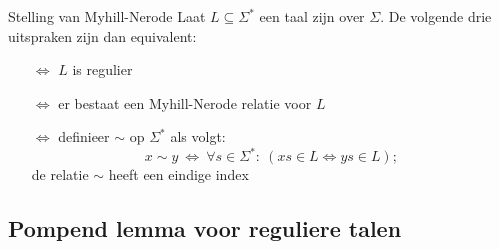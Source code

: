 \begin{lem}{Stelling van Myhill-Nerode}
    \vspace{-0.1cm}
    Laat $L \subseteq \Sigma^*$ een taal zijn over $\Sigma$. De volgende drie uitspraken zijn dan equivalent:
    \begin{itemize}
        \item[$\Leftrightarrow$] $L$ is regulier
        \item[$\Leftrightarrow$] er bestaat een Myhill-Nerode relatie voor $L$
        \item[$\Leftrightarrow$] 
            definieer $\sim$ op $\Sigma^*$ als volgt:
            \vspace{-0.15cm}
            \begin{equation*}
                x \sim y \ \Leftrightarrow \ \forall s \in \Sigma^*: \ ( xs \in L \Leftrightarrow ys \in L );
            \end{equation*}
            \vspace{-0.15cm}
            de relatie $\sim$ heeft een eindige index
    \end{itemize}
    \vspace{-0.2cm}
\end{lem}   

\subsection{Pompend lemma voor reguliere talen}

\vspace{0.5cm}

